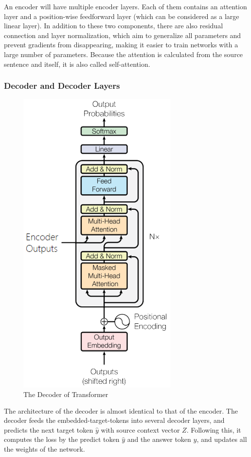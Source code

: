 An encoder will have multiple encoder layers. Each of them contains an attention layer and a position-wise feedforward layer (which can be considered as a large linear layer). In addition to these two components, there are also residual connection and layer normalization, which aim to generalize all parameters and prevent gradients from disappearing, making it easier to train networks with a large number of parameters. Because the attention is calculated from the source sentence and itself, it is also called self-attention. 

\subsubsection{Decoder and Decoder Layers}

\begin{figure}[h]
	\centering
	\includegraphics{../images/transformer-decoder.png}
    \caption{The Decoder of Transformer}
	\label{fig:transformer_decoder}
\end{figure}

The architecture of the decoder is almost identical to that of the encoder. The decoder feeds the embedded-target-tokens into several decoder layers, and predicts the next target token $\hat{y}$ with source context vector $Z$. Following this, it computes the loss by the predict token $\hat{y}$ and the answer token $y$, and updates all the weights of the network.

